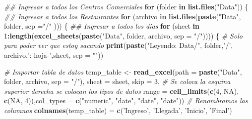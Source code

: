 \documentclass[]{article}
\newenvironment{Shaded}{\begin{snugshade}}{\end{snugshade}}
\newcommand{\CommentTok}[1]{\textcolor[rgb]{0.56,0.35,0.01}{\textit{#1}}}
\newcommand{\ControlFlowTok}[1]{\textcolor[rgb]{0.13,0.29,0.53}{\textbf{#1}}}
\newcommand{\DataTypeTok}[1]{\textcolor[rgb]{0.13,0.29,0.53}{#1}}
\newcommand{\DecValTok}[1]{\textcolor[rgb]{0.00,0.00,0.81}{#1}}
\newcommand{\KeywordTok}[1]{\textcolor[rgb]{0.13,0.29,0.53}{\textbf{#1}}}
\newcommand{\NormalTok}[1]{#1}
\newcommand{\OperatorTok}[1]{\textcolor[rgb]{0.81,0.36,0.00}{\textbf{#1}}}
\newcommand{\OtherTok}[1]{\textcolor[rgb]{0.56,0.35,0.01}{#1}}
\newcommand{\StringTok}[1]{\textcolor[rgb]{0.31,0.60,0.02}{#1}}
\begin{document}
\begin{Shaded}
\begin{Highlighting}[]
\CommentTok{## Ingresar a todos los Centros Comerciales}
\ControlFlowTok{for}\NormalTok{ (folder }\ControlFlowTok{in} \KeywordTok{list.files}\NormalTok{(}\StringTok{"Data"}\NormalTok{)) \{}
  \CommentTok{## Ingresar a todos los Restaurantes}
  \ControlFlowTok{for}\NormalTok{ (archivo }\ControlFlowTok{in} \KeywordTok{list.files}\NormalTok{(}\KeywordTok{paste}\NormalTok{(}\StringTok{"Data"}\NormalTok{, folder, }\DataTypeTok{sep =}\StringTok{"/"}\NormalTok{ ))) \{}
    \CommentTok{## Ingresar a todos los dias}
    \ControlFlowTok{for}\NormalTok{ (sheet }\ControlFlowTok{in} \DecValTok{1}\OperatorTok{:}\KeywordTok{length}\NormalTok{(}\KeywordTok{excel_sheets}\NormalTok{(}\KeywordTok{paste}\NormalTok{(}\StringTok{"Data"}\NormalTok{, folder, archivo, }\DataTypeTok{sep =} \StringTok{"/"}\NormalTok{)))) \{}
      \CommentTok{# Solo para poder ver que estoy sacando}
      \KeywordTok{print}\NormalTok{(}\KeywordTok{paste}\NormalTok{(}\StringTok{"Leyendo: Data/"}\NormalTok{, folder,}\StringTok{'/'}\NormalTok{, archivo,}\StringTok{': hoja-'}\NormalTok{,sheet, }\DataTypeTok{sep =} \StringTok{""}\NormalTok{))}
      
      \CommentTok{# Importar tabla de datos}
\NormalTok{      temp_table <-}\StringTok{ }\KeywordTok{read_excel}\NormalTok{(}\DataTypeTok{path =} \KeywordTok{paste}\NormalTok{(}\StringTok{"Data"}\NormalTok{, folder, archivo, }\DataTypeTok{sep =} \StringTok{"/"}\NormalTok{), }\DataTypeTok{sheet =}\NormalTok{ sheet, }\DataTypeTok{skip =} \DecValTok{3}\NormalTok{,}
                               \CommentTok{# Se coloca la esquina superior derecha se colocan los tipos de datos}
                               \DataTypeTok{range =} \KeywordTok{cell_limits}\NormalTok{(}\KeywordTok{c}\NormalTok{(}\DecValTok{4}\NormalTok{, }\OtherTok{NA}\NormalTok{), }\KeywordTok{c}\NormalTok{(}\OtherTok{NA}\NormalTok{, }\DecValTok{4}\NormalTok{)),}\DataTypeTok{col_types =} \KeywordTok{c}\NormalTok{(}\StringTok{"numeric"}\NormalTok{, }\StringTok{"date"}\NormalTok{, }\StringTok{"date"}\NormalTok{, }\StringTok{"date"}\NormalTok{))}
      \CommentTok{# Renombramos las columnas}
      \KeywordTok{colnames}\NormalTok{(temp_table) =}\StringTok{ }\KeywordTok{c}\NormalTok{(}\StringTok{'Ingreso'}\NormalTok{, }\StringTok{'Llegada'}\NormalTok{, }\StringTok{'Inicio'}\NormalTok{, }\StringTok{'Final'}\NormalTok{)}
      

\end{Highlighting}
\end{Shaded}
\end{document}
